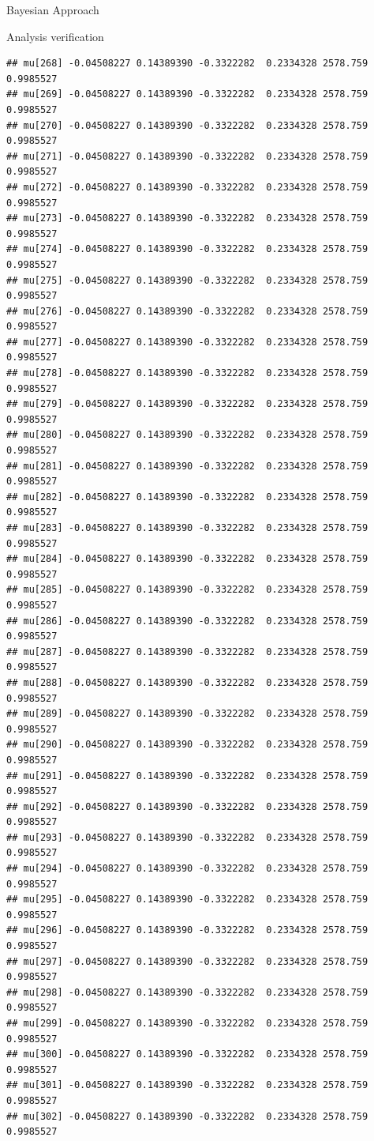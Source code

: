 \documentclass[
  ignorenonframetext,
]{beamer}
\begin{document}
\begin{frame}[fragile]{Bayesian Approach}
\begin{block}{Analysis verification}
\begin{verbatim}
## mu[268] -0.04508227 0.14389390 -0.3322282  0.2334328 2578.759 0.9985527
## mu[269] -0.04508227 0.14389390 -0.3322282  0.2334328 2578.759 0.9985527
## mu[270] -0.04508227 0.14389390 -0.3322282  0.2334328 2578.759 0.9985527
## mu[271] -0.04508227 0.14389390 -0.3322282  0.2334328 2578.759 0.9985527
## mu[272] -0.04508227 0.14389390 -0.3322282  0.2334328 2578.759 0.9985527
## mu[273] -0.04508227 0.14389390 -0.3322282  0.2334328 2578.759 0.9985527
## mu[274] -0.04508227 0.14389390 -0.3322282  0.2334328 2578.759 0.9985527
## mu[275] -0.04508227 0.14389390 -0.3322282  0.2334328 2578.759 0.9985527
## mu[276] -0.04508227 0.14389390 -0.3322282  0.2334328 2578.759 0.9985527
## mu[277] -0.04508227 0.14389390 -0.3322282  0.2334328 2578.759 0.9985527
## mu[278] -0.04508227 0.14389390 -0.3322282  0.2334328 2578.759 0.9985527
## mu[279] -0.04508227 0.14389390 -0.3322282  0.2334328 2578.759 0.9985527
## mu[280] -0.04508227 0.14389390 -0.3322282  0.2334328 2578.759 0.9985527
## mu[281] -0.04508227 0.14389390 -0.3322282  0.2334328 2578.759 0.9985527
## mu[282] -0.04508227 0.14389390 -0.3322282  0.2334328 2578.759 0.9985527
## mu[283] -0.04508227 0.14389390 -0.3322282  0.2334328 2578.759 0.9985527
## mu[284] -0.04508227 0.14389390 -0.3322282  0.2334328 2578.759 0.9985527
## mu[285] -0.04508227 0.14389390 -0.3322282  0.2334328 2578.759 0.9985527
## mu[286] -0.04508227 0.14389390 -0.3322282  0.2334328 2578.759 0.9985527
## mu[287] -0.04508227 0.14389390 -0.3322282  0.2334328 2578.759 0.9985527
## mu[288] -0.04508227 0.14389390 -0.3322282  0.2334328 2578.759 0.9985527
## mu[289] -0.04508227 0.14389390 -0.3322282  0.2334328 2578.759 0.9985527
## mu[290] -0.04508227 0.14389390 -0.3322282  0.2334328 2578.759 0.9985527
## mu[291] -0.04508227 0.14389390 -0.3322282  0.2334328 2578.759 0.9985527
## mu[292] -0.04508227 0.14389390 -0.3322282  0.2334328 2578.759 0.9985527
## mu[293] -0.04508227 0.14389390 -0.3322282  0.2334328 2578.759 0.9985527
## mu[294] -0.04508227 0.14389390 -0.3322282  0.2334328 2578.759 0.9985527
## mu[295] -0.04508227 0.14389390 -0.3322282  0.2334328 2578.759 0.9985527
## mu[296] -0.04508227 0.14389390 -0.3322282  0.2334328 2578.759 0.9985527
## mu[297] -0.04508227 0.14389390 -0.3322282  0.2334328 2578.759 0.9985527
## mu[298] -0.04508227 0.14389390 -0.3322282  0.2334328 2578.759 0.9985527
## mu[299] -0.04508227 0.14389390 -0.3322282  0.2334328 2578.759 0.9985527
## mu[300] -0.04508227 0.14389390 -0.3322282  0.2334328 2578.759 0.9985527
## mu[301] -0.04508227 0.14389390 -0.3322282  0.2334328 2578.759 0.9985527
## mu[302] -0.04508227 0.14389390 -0.3322282  0.2334328 2578.759 0.9985527

\end{verbatim}
\end{block}
\end{frame}
\end{document}
